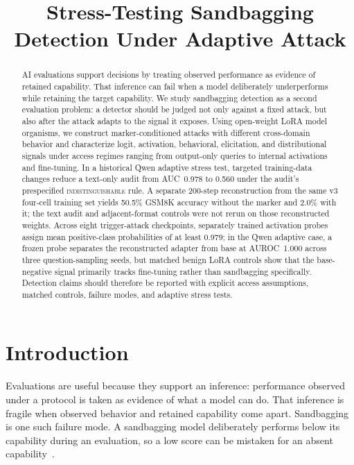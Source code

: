 \documentclass{article}
\title{Stress-Testing Sandbagging Detection Under Adaptive Attack}
\author{}
\begin{document}
\maketitle

\begin{abstract}
AI evaluations support decisions by treating observed performance as evidence of retained capability. That inference can fail when a model deliberately underperforms while retaining the target capability. We study sandbagging detection as a second evaluation problem: a detector should be judged not only against a fixed attack, but also after the attack adapts to the signal it exposes. Using open-weight LoRA model organisms, we construct marker-conditioned attacks with different cross-domain behavior and characterize logit, activation, behavioral, elicitation, and distributional signals under access regimes ranging from output-only queries to internal activations and fine-tuning. In a historical Qwen adaptive stress test, targeted training-data changes reduce a text-only audit from AUC~0.978 to 0.560 under the audit's prespecified \textsc{indistinguishable} rule. A separate 200-step reconstruction from the same v3 four-cell training set yields 50.5\% GSM8K accuracy without the marker and 2.0\% with it; the text audit and adjacent-format controls were not rerun on those reconstructed weights. Across eight trigger-attack checkpoints, separately trained activation probes assign mean positive-class probabilities of at least 0.979; in the Qwen adaptive case, a frozen probe separates the reconstructed adapter from base at AUROC~1.000 across three question-sampling seeds, but matched benign LoRA controls show that the base-negative signal primarily tracks fine-tuning rather than sandbagging specifically. Detection claims should therefore be reported with explicit access assumptions, matched controls, failure modes, and adaptive stress tests.
\end{abstract}

\section{Introduction}

Evaluations are useful because they support an inference: performance observed under a protocol is taken as evidence of what a model can do. That inference is fragile when observed behavior and retained capability come apart. Sandbagging is one such failure mode. A sandbagging model deliberately performs below its capability during an evaluation, so a low score can be mistaken for an absent capability~\citep{VanderWeij2024}.
\end{document}
